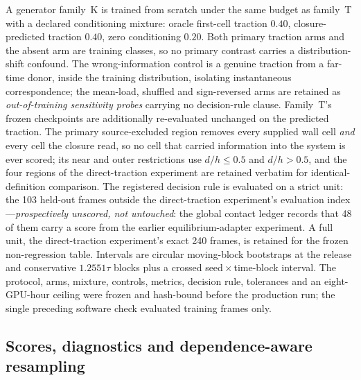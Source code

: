 A generator family~K is trained from scratch under the same budget as family~T with a declared
conditioning mixture: oracle first-cell traction $0.40$, closure-predicted traction $0.40$, zero
conditioning $0.20$. Both primary traction arms and the absent arm are training classes, so no
primary contrast carries a distribution-shift confound. The wrong-information control is
a genuine traction from a far-time donor, inside the training distribution,
isolating instantaneous correspondence; the mean-load, shuffled and sign-reversed arms are
retained as \emph{out-of-training sensitivity probes} carrying no decision-rule clause. Family~T's
frozen checkpoints are additionally re-evaluated unchanged on the predicted traction. The primary
source-excluded region removes every supplied wall cell \emph{and} every cell the closure
read, so no cell that carried information into the system is ever scored; its near and outer
restrictions use $d/h\leq0.5$ and $d/h>0.5$, and the four regions of the direct-traction
experiment are retained verbatim for identical-definition comparison. The registered
decision rule is evaluated on a strict unit: the 103 held-out frames outside the
direct-traction experiment's evaluation index---\emph{prospectively unscored, not untouched}: the
global contact ledger records that 48 of them carry a score from the earlier equilibrium-adapter
experiment. A full unit, the direct-traction experiment's exact 240 frames, is retained for the
frozen non-regression table. Intervals are circular moving-block bootstraps at the release and
conservative $1.2551\tau$ blocks plus a crossed seed\,$\times$\,time-block interval. The protocol,
arms, mixture, controls, metrics, decision rule, tolerances and an eight-GPU-hour ceiling were
frozen and hash-bound before the production run; the single preceding software check evaluated
training frames only.

\subsection{Scores, diagnostics and dependence-aware resampling}\label{sec:pointmethod}\label{sec:energymethod}\label{sec:statistics}

